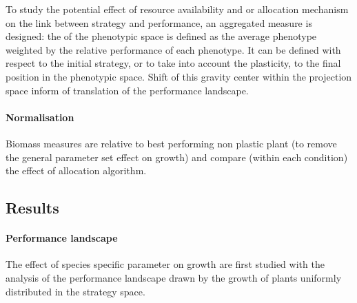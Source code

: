 To study the potential effect of resource availability and or allocation mechanism on the link between strategy and performance, an aggregated measure is designed: the  of the phenotypic space is defined as the average phenotype weighted by the relative performance of each phenotype. It can be defined with respect to the initial strategy, or to take into account the plasticity, to the final position in the phenotypic space. Shift of this gravity center within the projection space inform of translation of the performance landscape.

\paragraph{Normalisation}

Biomass measures are relative to best performing non plastic plant (to remove the general parameter set effect on growth) and compare (within each condition) the effect of allocation algorithm. %


\subsection{Results}

\paragraph{Performance landscape}
The effect of species specific parameter on growth are first studied with the analysis of the performance landscape drawn by the growth of plants uniformly distributed in the strategy space.


